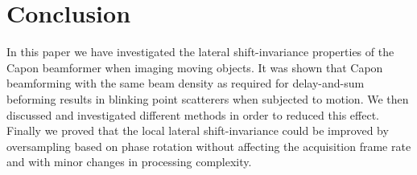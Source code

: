 \documentclass[journal]{IEEEtran}
\begin{document}


\section{Conclusion}\label{sec:con}
In this paper we have investigated the lateral shift-invariance properties of the Capon beamformer when imaging moving objects. It was shown that Capon beamforming with the same beam density as required for delay-and-sum beforming results in blinking point scatterers when subjected to motion.  We then discussed and investigated different methods in order to reduced this effect. Finally we proved that the local lateral shift-invariance could be improved by oversampling based on phase rotation without affecting the acquisition frame rate and with minor changes in processing complexity.


%
%
\end{document}
